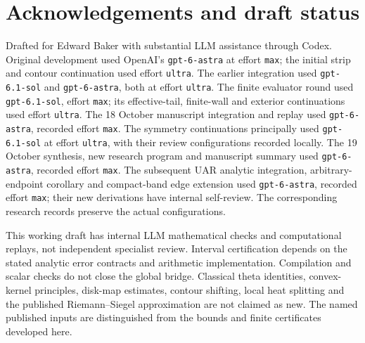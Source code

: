 \documentclass[11pt,letterpaper]{article}
\numberwithin{equation}{section}
\theoremstyle{definition}
\theoremstyle{remark}
\begin{document}
\section*{Acknowledgements and draft status}
Drafted for Edward Baker with substantial LLM assistance through Codex.
Original development used OpenAI's \texttt{gpt-6-astra} at effort
\texttt{max}; the initial strip and contour continuation used effort
\texttt{ultra}. The earlier integration used \texttt{gpt-6.1-sol}
and \texttt{gpt-6-astra}, both at effort \texttt{ultra}.
The finite evaluator round used \texttt{gpt-6.1-sol}, effort \texttt{max};
its effective-tail, finite-wall and exterior continuations used effort
\texttt{ultra}. The 18 October manuscript integration and replay used
\texttt{gpt-6-astra}, recorded effort \texttt{max}.
The symmetry continuations principally used \texttt{gpt-6.1-sol} at
effort \texttt{ultra}, with their review configurations recorded locally.
The 19 October synthesis, new research program and manuscript summary used
\texttt{gpt-6-astra}, recorded effort \texttt{max}.
The subsequent UAR analytic integration, arbitrary-endpoint corollary
and compact-band edge extension used \texttt{gpt-6-astra}, recorded effort
\texttt{max}; their new derivations have internal self-review.
The corresponding research records preserve the actual configurations.

This working draft has internal LLM mathematical checks and computational
replays, not independent specialist review. Interval certification
depends on the stated analytic error contracts and arithmetic implementation.
Compilation and scalar checks do not close the global bridge.
Classical theta identities, convex-kernel principles, disk-map estimates,
contour shifting, local heat splitting and the published Riemann--Siegel
approximation are not claimed as new. The named published inputs are
distinguished from the bounds and finite certificates developed here.
\end{document}
